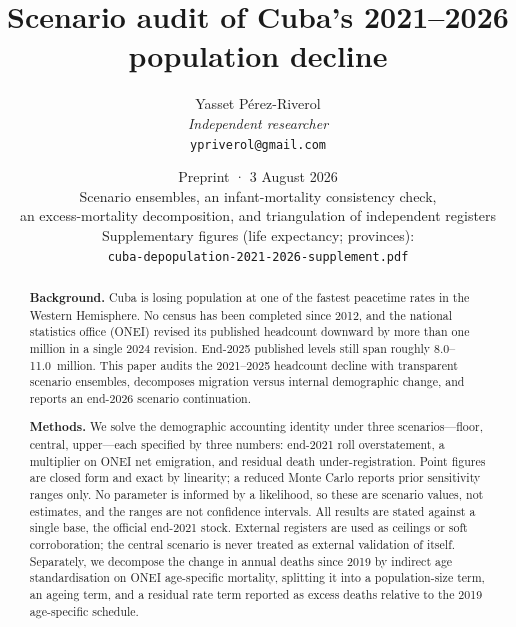 \documentclass[11pt,a4paper]{article}
\title{Scenario audit of Cuba's 2021--2026 population decline}
\author{Yasset P\'erez-Riverol\\
\textit{Independent researcher}\\
\texttt{ypriverol@gmail.com}}
\date{Preprint · 3 August 2026\\[0.35em]
\normalsize Scenario ensembles, an infant-mortality consistency check,\\
an excess-mortality decomposition, and triangulation of independent registers\\[0.4em]
\footnotesize Supplementary figures (life expectancy; provinces):\\
\texttt{cuba-depopulation-2021-2026-supplement.pdf}}
\begin{document}
\maketitle

\begin{abstract}
\textbf{Background.}
Cuba is losing population at one of the fastest peacetime rates in the Western Hemisphere.
No census has been completed since 2012, and the national statistics office (ONEI) revised its published headcount downward by more than one million in a single 2024 revision.
End-2025 published levels still span roughly 8.0--11.0~million.
This paper audits the 2021--2025 headcount decline with transparent scenario ensembles, decomposes migration versus internal demographic change, and reports an end-2026 scenario continuation.

\textbf{Methods.}
We solve the demographic accounting identity under three scenarios---floor, central, upper---each specified by three numbers: end-2021 roll overstatement, a multiplier on ONEI net emigration, and residual death under-registration.
Point figures are closed form and exact by linearity; a reduced Monte Carlo reports prior sensitivity ranges only.
No parameter is informed by a likelihood, so these are scenario values, not estimates, and the ranges are not confidence intervals.
All results are stated against a single base, the official end-2021 stock.
External registers are used as ceilings or soft corroboration; the central scenario is never treated as external validation of itself.
Separately, we decompose the change in annual deaths since 2019 by indirect age standardisation on ONEI age-specific mortality, splitting it into a population-size term, an ageing term, and a residual rate term reported as excess deaths relative to the 2019 age-specific schedule.


\end{abstract}
\end{document}
